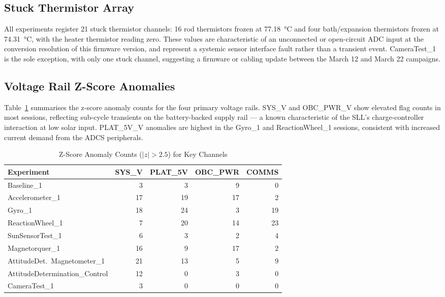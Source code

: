 \documentclass[conference]{IEEEtran}
\begin{document}
\subsection{Stuck Thermistor Array}

All experiments register 21 stuck thermistor channels: 16 rod
thermistors frozen at \SI{77.18}{\celsius} and four bath/expansion
thermistors frozen at \SI{74.31}{\celsius}, with the heater
thermistor reading zero.  These values are characteristic of an
unconnected or open-circuit ADC input at the conversion resolution
of this firmware version, and represent a systemic sensor interface
fault rather than a transient event.  CameraTest\_1 is the sole
exception, with only one stuck channel, suggesting a firmware or
cabling update between the March 12 and March 22 campaigns.

\subsection{Voltage Rail Z-Score Anomalies}

Table~\ref{tab:zscore} summarises the z-score anomaly counts for
the four primary voltage rails.  SYS\_V and OBC\_PWR\_V show
elevated flag counts in most sessions, reflecting sub-cycle
transients on the battery-backed supply rail — a known
characteristic of the SLL's charge-controller interaction at low
solar input.  PLAT\_5V\_V anomalies are highest in the Gyro\_1 and
ReactionWheel\_1 sessions, consistent with increased current demand
from the ADCS peripherals.

\begin{table}[t]
\caption{Z-Score Anomaly Counts ($|z|>2.5$) for Key Channels}
\label{tab:zscore}
\centering
\footnotesize
\begin{tabular}{@{}lrrrr@{}}
\toprule
\textbf{Experiment} & \textbf{SYS\_V} & \textbf{PLAT\_5V} & \textbf{OBC\_PWR} & \textbf{COMMS} \\
\midrule
Baseline\_1                    &  3 &  3 &  9 &  0 \\
Accelerometer\_1               & 17 & 19 & 17 &  2 \\
Gyro\_1                        & 18 & 24 &  3 & 19 \\
ReactionWheel\_1               &  7 & 20 & 14 & 23 \\
SunSensorTest\_1               &  6 &  3 &  2 &  4 \\
Magnetorquer\_1                & 16 &  9 & 17 &  2 \\
AttitudeDet.\ Magnetometer\_1  & 21 & 13 &  5 &  9 \\
AttitudeDetermination\_Control & 12 &  0 &  3 &  0 \\
CameraTest\_1                  &  3 &  0 &  0 &  0 \\
\bottomrule
\end{tabular}
\end{table}
\end{document}
